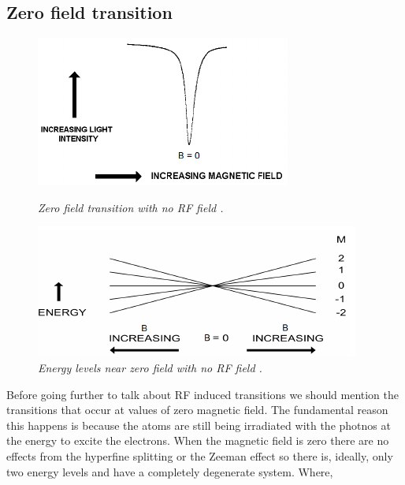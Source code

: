 \documentclass[twocolumn]{article}
\begin{document}
\subsection{Zero field transition}
\begin{figure}
\begin{minipage}[t]{0.44\textwidth}
\includegraphics[width=\linewidth]{pictures/zero-field-trans.png}
\caption{\textit{Zero field transition with no RF field \cite{ref:3}.}}
\label{fig:11}
\end{minipage}
\hfill
\begin{minipage}[t]{0.44\textwidth}
\includegraphics[width=\linewidth]{pictures/energy-zero.png}
\caption{\textit{Energy levels near zero field with no RF field \cite{ref:3}.}}
\label{fig:12}
\end{minipage}
\end{figure}
Before going further to talk about RF induced transitions we should mention the 
transitions that occur at values of zero magnetic field. The fundamental reason 
this happens is because the atoms are still being irradiated with the photnos 
at the energy to excite the electrons. When the magnetic field is zero there 
are no effects from the hyperfine splitting or the Zeeman effect so there is, 
ideally, only two energy levels and have a completely degenerate system. Where, 
\end{document}
